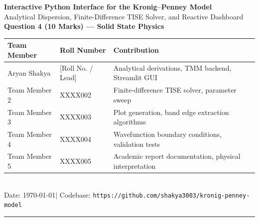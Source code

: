 \documentclass[10pt, a4paper]{article}
\begin{document}

\begin{center}
    {\Large\bfseries Interactive Python Interface for the Kronig–Penney Model}\\[2pt]
    {\large Analytical Dispersion, Finite-Difference TISE Solver, and Reactive Dashboard}\\[4pt]
    {\normalsize\textbf{Question 4 (10 Marks) --- Solid State Physics}}\\[5pt]
    \begin{tabular}{lll}
        \toprule
        \textbf{Team Member} & \textbf{Roll Number} & \textbf{Contribution} \\
        \midrule
        Aryan Shakya & [Roll No. / Lead] & Analytical derivations, TMM backend, Streamlit GUI \\
        Team Member 2 & XXXX002 & Finite-difference TISE solver, parameter sweep \\
        Team Member 3 & XXXX003 & Plot generation, band edge extraction algorithms \\
        Team Member 4 & XXXX004 & Wavefunction boundary conditions, validation tests \\
        Team Member 5 & XXXX005 & Academic report documentation, physical interpretation \\
        \bottomrule
    \end{tabular}\\[3pt]
    {\footnotesize Date: \today \quad $\vert$ \quad Codebase: \texttt{https://github.com/shakya3003/kronig-penney-model}}
\end{center}
\vspace{-8pt}
\hrule
\vspace{4pt}

\begin{abstract}
\noindent We present a comprehensive analytical and computational investigation of the one-dimensional \textbf{Kronig--Penney model} describing an electron in a periodic crystalline potential. We derive the exact transcendental dispersion relation connecting electron energy $E$ to crystal momentum $k$ and solve the Time-Independent Schrödinger Equation (TISE) across multi-well superlattices via both the unimodular Transfer Matrix Method (TMM) and direct tridiagonal finite-difference matrix diagonalization. We develop a reactive web interface using Streamlit with real-time sliders for all physical parameters ($N, E, a, b, V_0$) and dynamic band-state diagnostics. Quantitative parameter sweeps with respect to well width $a$ validate quantum confinement scaling ($E \propto 1/a^2$) and demonstrate the compression of allowed bands into discrete atomic energy levels (tight-binding limit).
\end{abstract}
\vspace{-6pt}
\end{document}
